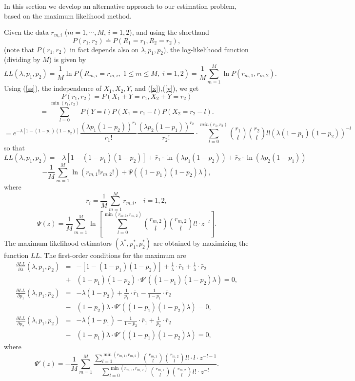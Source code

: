 \documentclass[a4paper,10pt,twoside]{article}
\begin{document}
In this section we develop an alternative approach to our estimation problem, based on the maximum likelihood method.

Given the data $r_{m,i}$ ($m=1,\cdots,M$, $i=1,2$), and using the shorthand
$$P(r_1,r_2)\doteq P(R_1=r_1,R_2=r_2),$$
(note that $P(r_1,r_2)$ in fact depends also on $\lambda,p_1,p_2$), 
the log-likelihood function (dividing by $M$) is given by
$$LL(\lambda,p_1,p_2)=\frac{1}{M}\ln P(R_{m,i}=r_{m,i},\;1\leq m\leq M,\;i=1,2)=\frac{1}{M}\sum_{m=1}^M \ln P(r_{m,1},r_{m,2}).$$
Using (\ref{ss}), the independence of $X_{1},X_{2},Y$, and (\ref{x}),(\ref{y}), we get
$$P(r_1,r_2)=P(X_{1}+Y=r_{1},X_{2}+Y=r_{2})$$
$$= \sum_{l=0}^{\min(r_{1},r_{2})} P(Y=l)P(X_{1}=r_{1}-l)P(X_{2}=r_{2}-l).$$
$$=e^{-\lambda[1-(1-p_1)(1-p_2)]}\frac{\left(\lambda p_1(1-p_2)\right)^{r_1}}{r_1!}\frac{\left(\lambda p_2(1-p_1)\right)^{r_2}}{r_2!}\cdot \sum_{l=0}^{min{(r_1,r_2)}} \binom{r_1}{l}\binom{r_2}{l}l!\left(\lambda(1-p_1)(1-p_2)\right)^{-l}$$
so that
$$LL(\lambda,p_1,p_2)=-\lambda [1-(1-p_1)(1-p_2)]+\bar{r}_1\cdot \ln(\lambda p_1(1-p_2))+\bar{r}_2\cdot \ln(\lambda p_2(1-p_1))$$
$$-\frac{1}{M}\sum_{m=1}^M \ln(r_{m,1}!r_{m,2}!) 
+\Psi((1-p_1)(1-p_2)\lambda),$$
where
$$\bar{r}_i=\frac{1}{M}\sum_{m=1}^M r_{m,i},\;\;\;i=1,2,$$
$$\Psi(z)=\frac{1}{M}\sum_{m=1}^M \ln \left[\sum_{l=0}^{\min(r_{m,1},r_{m,2})} \binom{r_{m,2}}{l}\binom{r_{m,2}}{l}l!\cdot z^{-l} \right].$$
The maximum likelihood estimators $(\lambda^*,p_1^*,p_2^*)$ are
obtained by maximizing the function $LL$. The first-order conditions for the maximum are
\begin{eqnarray}\label{lle1} \frac{\partial LL}{\partial \lambda}(\lambda,p_1,p_2)
&=&- [1-(1-p_1)(1-p_2)]+\frac{1}{\lambda}\cdot \bar{r}_1 +\frac{1}{\lambda}\cdot \bar{r}_2\\
&+&(1-p_1)(1-p_2)\cdot \Psi'((1-p_1)(1-p_2)\lambda ) =0,\nonumber\\
\label{lle2} \frac{\partial LL}{\partial p_1}(\lambda,p_1,p_2)
&=&-\lambda (1-p_2)+\frac{1}{p_1}\cdot \bar{r}_1-\frac{1}{1-p_1}\cdot \bar{r}_2\\ &-&(1-p_2)\lambda\cdot \Psi'((1-p_1)(1-p_2)\lambda )=0,\nonumber\\
\label{lle3}\frac{\partial LL}{\partial p_2}(\lambda,p_1,p_2)
&=&-\lambda (1-p_1)-\frac{1}{1-p_2}\cdot \bar{r}_1+\frac{1}{p_2}\cdot \bar{r}_2\\&-&(1-p_1)\lambda \cdot \Psi'((1-p_1)(1-p_2)\lambda )=0,\nonumber
\end{eqnarray}
where
$$\Psi'(z)=-\frac{1}{M}\sum_{m=1}^M \frac{\sum_{l=1}^{\min(r_{m,1},r_{m,2})} \binom{r_{m,1}}{l}\binom{r_{m,2}}{l}l!\cdot l\cdot z^{-l-1}}{\sum_{l=0}^{\min(r_{m,1},r_{m,2})} \binom{r_{m,1}}{l}\binom{r_{m,2}}{l}l!\cdot z^{-l}}.$$
\end{document}
